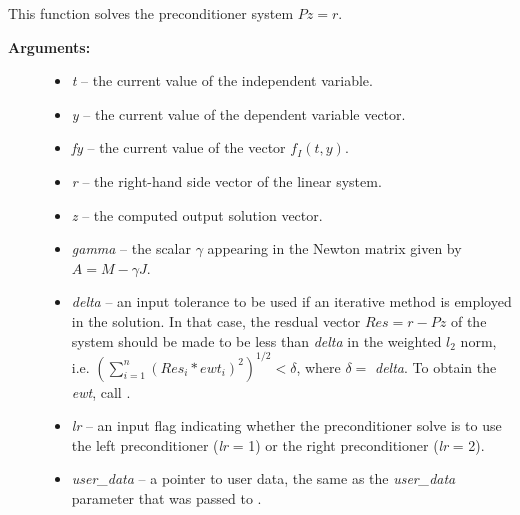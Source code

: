 \documentclass[letterpaper,10pt,english]{sphinxmanual}
\begin{document}
\begin{fulllineitems}
\label{c_interface/User_supplied:c.ARKSpilsPrecSolveFn}
This function solves the preconditioner system \(Pz=r\).
\begin{description}
\item[{\textbf{Arguments:}}] \leavevmode\begin{itemize}
\item {} 
\emph{t} -- the current value of the independent variable.

\item {} 
\emph{y} -- the current value of the dependent variable vector.

\item {} 
\emph{fy} -- the current value of the vector \(f_I(t,y)\).

\item {} 
\emph{r} -- the right-hand side vector of the linear system.

\item {} 
\emph{z} -- the computed output solution vector.

\item {} 
\emph{gamma} -- the scalar \(\gamma\) appearing in the Newton
matrix given by \(A=M-\gamma J\).

\item {} 
\emph{delta} -- an input tolerance to be used if an iterative method
is employed in the solution.  In that case, the resdual vector
\(Res = r-Pz\) of the system should be made to be less than \emph{delta}
in the weighted \(l_2\) norm, i.e. \(\left(\sum_{i=1}^n
\left(Res_i * ewt_i\right)^2 \right)^{1/2} < \delta\), where \(\delta =\)
\emph{delta}.  To obtain the  \emph{ewt}, call
{\hyperref[c_interface/User_callable:c.ARKodeGetErrWeights]{\emph{}}}.

\item {} 
\emph{lr} -- an input flag indicating whether the preconditioner
solve is to use the left preconditioner (\emph{lr} = 1) or the right
preconditioner (\emph{lr} = 2).

\item {} 
\emph{user\_data} -- a pointer to user data, the same as the
\emph{user\_data} parameter that was passed to {\hyperref[c_interface/User_callable:c.ARKodeSetUserData]{\emph{}}}.


\end{itemize}
\end{description}
\end{fulllineitems}
\end{document}
